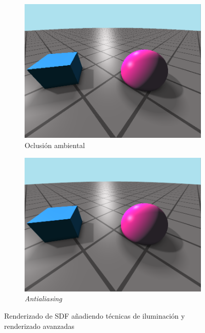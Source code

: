 \begin{figure}[ht!]
\begin{subfigure}[b]{0.45\textwidth}
        \includegraphics[width=\textwidth]{Plantilla-TFG-master/img/escena7_AO.png}
        \caption{Oclusión ambiental}
    \end{subfigure}
    \hfill
    \begin{subfigure}[b]{0.45\textwidth}
        \centering
        \includegraphics[width=\textwidth]{Plantilla-TFG-master/img/escena9_AA3.png}
        \caption{\textit{Antialiasing}}
    \end{subfigure}

    \caption{Renderizado de SDF añadiendo técnicas de iluminación y renderizado avanzadas}
\end{figure}


\endinput